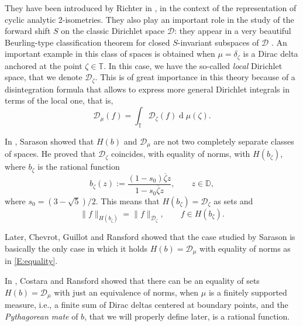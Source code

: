 \documentclass[12pt]{amsart}
\theoremstyle{definition}
\theoremstyle{remark}
\theoremstyle{remark}
\begin{document}
They have been introduced by Richter in \cite{Richter1991}, in the context of the representation of cyclic analytic 2-isometries. They also play an important role in the study of the forward shift $S$ on the classic Dirichlet space $\mathcal{D}$: they appear in a very beautiful Beurling-type classification theorem for closed $S$-invariant subspaces of $\mathcal{D}$ \cite{RS1}. An important example in this class of spaces is obtained when $\mu=\delta_\zeta$ is a Dirac delta anchored at the point $\zeta\in\mathbb{T}$. In this case, we have the so-called \emph{local} Dirichlet space, that we denote $\mathcal{D}_\zeta$. This is of great importance in this theory because of a disintegration formula that allows to express more general Dirichlet integrals in terms of the local one, that is,
\begin{equation*}
    \mathcal{D}_\mu(f)=\int_{\mathbb{T}} \mathcal{D}_\zeta(f) \operatorname{d}\!\mu(\zeta).
    \end{equation*}
    
    In \cite{Sarason1997LocalDS}, Sarason showed that 
    $H(b)$ and $\mathcal{D}_\mu$  are not two
    completely separate classes of spaces. He proved that $\mathcal{D}_\zeta$ coincides, with equality of norms, with $H(b_\zeta)$, where $b_\zeta$ is  the rational function
\begin{equation}\label{E:b1}
    b_\zeta(z):= \frac{(1-s_0)\overline{\zeta}z}{1-s_0 \overline{\zeta}z}, \qquad z\in\mathbb D,
\end{equation}
where $s_0=(3-\sqrt{5})/2$. %
This means that $H(b_\zeta) = \mathcal{D}_\zeta$ as sets and 
\begin{equation}\label{E:equality}
    \|f\|_{H(b_\zeta)}= \|f\|_{\mathcal{D}_\zeta}, \qquad f \in H(b_\zeta).
\end{equation}


Later, Chevrot, Guillot and Ransford \cite{Chevrot2010} showed that the case studied by Sarason is basically the only case in which it holds $H(b) = \mathcal{D}_\mu$ with equality of norms as in \eqref{E:equality}. 

 In \cite{costara2013}, Costara and Ransford showed that
 there can be an equality of sets $H(b) = \mathcal{D}_\mu$ with just
 an equivalence of norms, when $\mu$ is a finitely supported measure,
 i.e., a finite sum of Dirac deltas centered at boundary points, and
 the \emph{Pythagorean mate} of $b$, that we will properly define
 later, is a rational function. 
\end{document}
